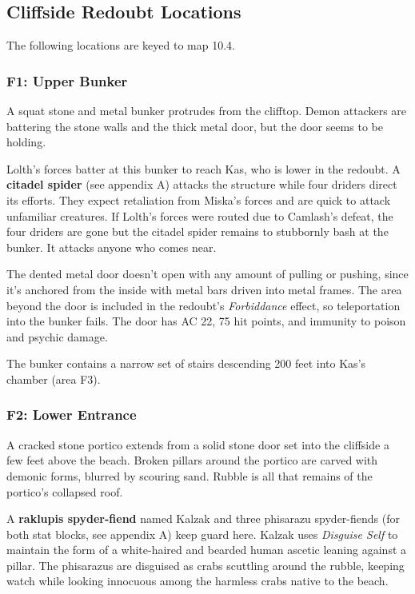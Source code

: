 \documentclass[10pt,a4paper,twoside,bg=print,twocolumn,openany,nodeprecatedcode]{dndbook}
\begin{document}
\subsection{Cliffside Redoubt Locations}
The following locations are keyed to map 10.4.

\subsubsection{F1: Upper Bunker}
\begin{DndReadAloud}{}
A squat stone and metal bunker protrudes from the clifftop. Demon attackers are battering the stone walls and the thick metal door, but the door seems to be holding.

\end{DndReadAloud}

Lolth's forces batter at this bunker to reach Kas, who is lower in the redoubt. A \textbf{citadel spider} (see appendix A) attacks the structure while four driders direct its efforts. They expect retaliation from Miska's forces and are quick to attack unfamiliar creatures. If Lolth's forces were routed due to Camlash's defeat, the four driders are gone but the citadel spider remains to stubbornly bash at the bunker. It attacks anyone who comes near.

The dented metal door doesn't open with any amount of pulling or pushing, since it's anchored from the inside with metal bars driven into metal frames. The area beyond the door is included in the redoubt's \textit{Forbiddance} effect, so teleportation into the bunker fails. The door has AC 22, 75 hit points, and immunity to poison and psychic damage.

The bunker contains a narrow set of stairs descending 200 feet into Kas's chamber (area F3).

\subsubsection{F2: Lower Entrance}
\begin{DndReadAloud}{}
A cracked stone portico extends from a solid stone door set into the cliffside a few feet above the beach. Broken pillars around the portico are carved with demonic forms, blurred by scouring sand. Rubble is all that remains of the portico's collapsed roof.

\end{DndReadAloud}

A \textbf{raklupis spyder-fiend} named Kalzak and three phisarazu spyder-fiends (for both stat blocks, see appendix A) keep guard here. Kalzak uses \textit{Disguise Self} to maintain the form of a white-haired and bearded human ascetic leaning against a pillar. The phisarazus are disguised as crabs scuttling around the rubble, keeping watch while looking innocuous among the harmless crabs native to the beach.
\end{document}
